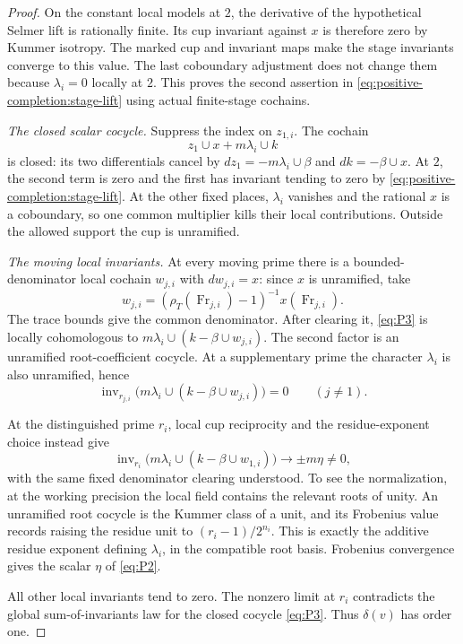 \begin{proof}
On the constant local models at \(2\), the derivative of the
hypothetical Selmer lift is rationally finite. Its cup invariant
against \(x\) is therefore zero by Kummer isotropy. The marked cup
and invariant maps make the stage invariants converge to this value.
The last coboundary adjustment does not change them because
\(\lambda_i=0\) locally at \(2\). This proves the second assertion
in \eqref{eq:positive-completion:stage-lift} using actual finite-stage
cochains.

\emph{The closed scalar cocycle.}
Suppress the index on \(z_{1,i}\). The cochain
\[
                   z_1\cup x+m\lambda_i\cup k
                   \tag{P3}\label{eq:P3}
\]
is closed: its two differentials cancel by
\(dz_1=-m\lambda_i\cup\beta\) and \(dk=-\beta\cup x\).
At \(2\), the second term is zero and the first has invariant tending
to zero by \eqref{eq:positive-completion:stage-lift}.
At the other fixed places, \(\lambda_i\) vanishes and the rational
\(x\) is a coboundary, so one common multiplier kills their local
contributions. Outside the allowed support the cup is unramified.

\emph{The moving local invariants.}
At every moving prime there is a bounded-denominator local cochain
\(w_{j,i}\) with \(dw_{j,i}=x\): since \(x\) is unramified, take
\[
 w_{j,i}=(\rho_T(\operatorname{Fr}_{j,i})-1)^{-1}
                                      x(\operatorname{Fr}_{j,i}).
\]
The trace bounds give the common denominator. After clearing it,
\eqref{eq:P3} is locally cohomologous to
\(m\lambda_i\cup(k-\beta\cup w_{j,i})\). The second factor is an
unramified root-coefficient cocycle. At a supplementary prime the
character \(\lambda_i\) is also unramified, hence
\[
 \operatorname{inv}_{r_{j,i}}\bigl(m\lambda_i\cup
                   (k-\beta\cup w_{j,i})\bigr)=0
                    \qquad(j\ne1).
\]

At the distinguished prime \(r_i\), local cup reciprocity and the
residue-exponent choice instead give
\[
 \operatorname{inv}_{r_i}\bigl(m\lambda_i\cup
                   (k-\beta\cup w_{1,i})\bigr)
       \longrightarrow \pm m\eta\ne0,
\]
with the same fixed denominator clearing understood. To see the
normalization, at the working precision the local field contains
the relevant roots of unity. An unramified root cocycle is the Kummer
class of a unit, and its Frobenius value records raising the residue
unit to \((r_i-1)/2^{n_i}\). This is exactly the additive residue
exponent defining \(\lambda_i\), in the compatible root basis.
Frobenius convergence gives the scalar \(\eta\) of \eqref{eq:P2}.

All other local invariants tend to zero. The nonzero limit at \(r_i\)
contradicts the global sum-of-invariants law for the closed cocycle
\eqref{eq:P3}. Thus \(\delta(v)\) has order one.
\end{proof}

